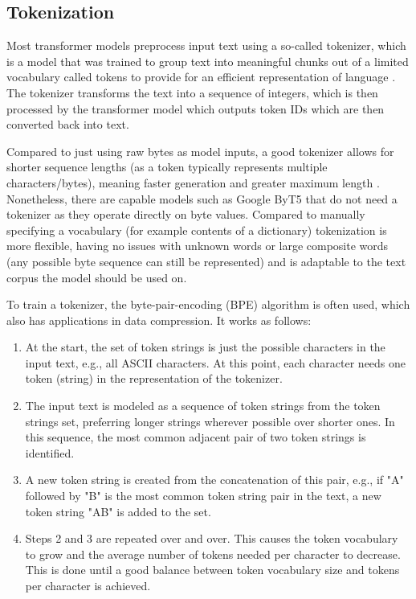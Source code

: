 \subsection{Tokenization}
\label{transformer:tokenization}

Most transformer models preprocess input text using a so-called tokenizer, which is a model that was trained to group text into meaningful chunks out of a limited vocabulary called tokens to provide for an efficient representation of language \cite{subwordunits}. The tokenizer transforms the text into a sequence of integers, which is then processed by the transformer model which outputs token IDs which are then converted back into text.

Compared to just using raw bytes as model inputs, a good tokenizer allows for shorter sequence lengths (as a token typically represents multiple characters/bytes), meaning faster generation and greater maximum length \cite{tokenizerchoice}. Nonetheless, there are capable models such as Google ByT5 \cite{xue2022byt5} that do not need a tokenizer as they operate directly on byte values.
Compared to manually specifying a vocabulary (for example contents of a dictionary) tokenization is more flexible, having no issues with unknown words or large composite words (any possible byte sequence can still be represented) and is adaptable to the text corpus the model should be used on.

To train a tokenizer, the byte-pair-encoding (BPE) algorithm \cite{subwordunits} is often used, which also has applications in data compression. It works as follows:

\begin{enumerate}
	\item At the start, the set of token strings is just the possible characters in the input text, e.g., all ASCII characters. At this point, each character needs one token (string) in the representation of the tokenizer.
	\item The input text is modeled as a sequence of token strings from the token strings set, preferring longer strings wherever possible over shorter ones. In this sequence, the most common adjacent pair of two token strings is identified.
	\item A new token string is created from the concatenation of this pair, e.g., if "A" followed by "B" is the most common token string pair in the text, a new token string "AB" is added to the set.
	\item Steps 2 and 3 are repeated over and over. This causes the token vocabulary to grow and the average number of tokens needed per character to decrease. This is done until a good balance between token vocabulary size and tokens per character is achieved.
\end{enumerate}


